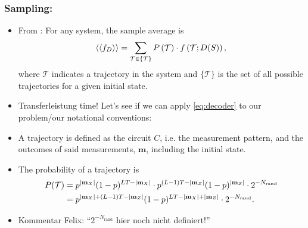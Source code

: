 \subsubsection{Sampling:}
\begin{itemize}
  \item From \cite{roserDecodingProjectiveTransverse2023}:
    For any system, the sample average is
    \begin{align}\label{eq:decoder}
      \expval{\expval{f_D}} = \sum_{\mathcal{T} \in \{
    \mathcal{T} \} } P\left(\mathcal{T}\right) \cdot
    f\left(\mathcal{T} ; D(S)\right)
    ,\end{align}
  where $\mathcal{T}$ indicates a trajectory in the system and
  $\{ \mathcal{T} \}$ is the set of all possible trajectories for a given
  initial state.
  \item Transferleistung time! Let's see if we can apply \cref{eq:decoder} to our
    problem/our notational conventions:
  \item A trajectory is defined as the circuit $C$, i.e. the measurement pattern,
    and the outcomes of said measurements, $\mathbf{m}$, including the initial
    state. 
  \item The probability of a trajectory is
    \begin{align}
      P(\mathcal{T}) &=
      p^{\abs{\mathbf{m}_X}}(1-p)^{LT-\abs{\mathbf{m}_X}}\cdot
      p^{(L-1)T-\abs{\mathbf{m}_Z}}(1-p)^{\abs{\mathbf{m}_Z}}\cdot
      2^{-N_\mathrm{rand}} \nonumber\\ &= 
      p^{\abs{\mathbf{m}_X}+(L-1)T-\abs{\mathbf{m}_Z}}(1-p)^{LT-\abs{\mathbf{m}_X}+\abs{\mathbf{m}_Z}}\cdot2^{-N_\mathrm{rand}}
    .\end{align}
  \item \textcolor{kw-olive}{Kommentar Felix: \enquote{$2^{-N_\mathrm{rand}}$ hier noch
    nicht definiert!}}
  

\end{itemize}
